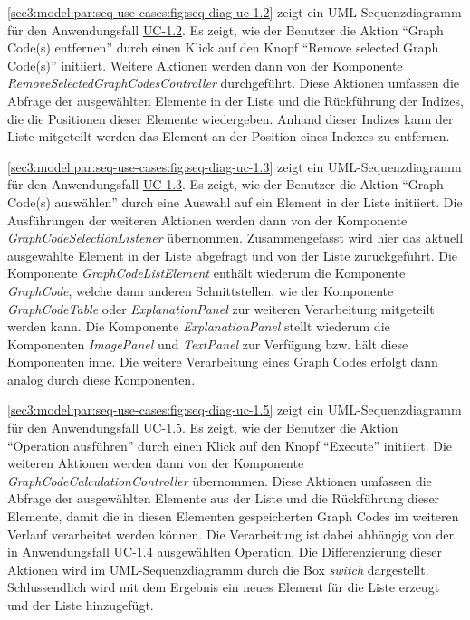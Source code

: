 

\cref{sec3:model:par:seq-use-cases:fig:seq-diag-uc-1.2} zeigt ein UML-Sequenzdiagramm für den Anwendungsfall \hyperref[sec3:model:uc-1.2]{UC-1.2}.
Es zeigt, wie der Benutzer die Aktion \enquote{Graph Code(s) entfernen} durch einen Klick auf den Knopf \enquote{Remove selected Graph Code(s)} initiiert.
Weitere Aktionen werden dann von der Komponente \textit{RemoveSelectedGraphCodesController} durchgeführt.
Diese Aktionen umfassen die Abfrage der ausgewählten Elemente in der Liste und die Rückführung der Indizes, die die Positionen dieser Elemente wiedergeben.
Anhand dieser Indizes kann der Liste mitgeteilt werden das Element an der Position eines Indexes zu entfernen.



\cref{sec3:model:par:seq-use-cases:fig:seq-diag-uc-1.3} zeigt ein UML-Sequenzdiagramm für den Anwendungsfall \hyperref[sec3:model:uc-1.3]{UC-1.3}.
Es zeigt, wie der Benutzer die Aktion \enquote{Graph Code(s) auswählen} durch eine Auswahl auf ein Element in der Liste initiiert.
Die Ausführungen der weiteren Aktionen werden dann von der Komponente \textit{GraphCodeSelectionListener} übernommen.
Zusammengefasst wird hier das aktuell ausgewählte Element in der Liste abgefragt und von der Liste zurückgeführt.
Die Komponente \textit{GraphCodeListElement} enthält wiederum die Komponente \textit{GraphCode}, welche dann anderen Schnittstellen, wie der Komponente \textit{GraphCodeTable} oder \textit{ExplanationPanel} zur weiteren Verarbeitung mitgeteilt werden kann.
Die Komponente \textit{ExplanationPanel} stellt wiederum die Komponenten \textit{ImagePanel} und \textit{TextPanel} zur Verfügung bzw. hält diese Komponenten inne.
Die weitere Verarbeitung eines Graph Codes erfolgt dann analog durch diese Komponenten.



\cref{sec3:model:par:seq-use-cases:fig:seq-diag-uc-1.5} zeigt ein UML-Sequenzdiagramm für den Anwendungsfall \hyperref[sec3:model:uc-1.5]{UC-1.5}.
Es zeigt, wie der Benutzer die Aktion \enquote{Operation ausführen} durch einen Klick auf den Knopf \enquote{Execute} initiiert.
Die weiteren Aktionen werden dann von der Komponente \textit{GraphCodeCalculationController} übernommen.
Diese Aktionen umfassen die Abfrage der ausgewählten Elemente aus der Liste und die Rückführung dieser Elemente, damit die in diesen Elementen gespeicherten Graph Codes im weiteren Verlauf verarbeitet werden können.
Die Verarbeitung ist dabei abhängig von der in Anwendungsfall \hyperref[sec3:model:uc-1.4]{UC-1.4} ausgewählten Operation.
Die Differenzierung dieser Aktionen wird im UML-Sequenzdiagramm durch die Box \textit{switch} dargestellt.
Schlussendlich wird mit dem Ergebnis ein neues Element für die Liste erzeugt und der Liste hinzugefügt.

